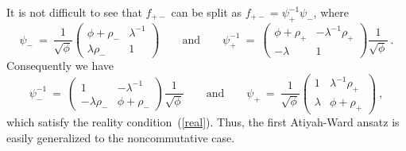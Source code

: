 \documentclass[a4paper,11pt]{article}
\numberwithin{equation}{section}
\def\l{\lambda}
\def\r{\rho}
\begin{document}
It is not difficult to see that $f_{+-}$ can be split as
$f_{+-}=\psi^{-1}_+\psi_-$, where
\begin{equation}
\psi_-\ =\ \frac{1}{\sqrt\phi}
\begin{pmatrix} \phi+\r_- & {\l}^{-1} \\ \l\r_- & 1 \end{pmatrix}
\qquad\textrm{and}\qquad
\psi^{-1}_+\ =\ 
\begin{pmatrix} \phi+\r_+ & -{\l}^{-1}\r_+ \\ -\l & 1 \end{pmatrix} 
\frac{1}{\sqrt\phi}\ .
\end{equation}
Consequently we have
\begin{equation}
\psi^{-1}_-\ =\ 
\begin{pmatrix} 1 & -{\l}^{-1} \\ -\l\r_- & \phi+\r_- \end{pmatrix}
\frac{1}{\sqrt\phi}
\qquad\textrm{and}\qquad
\psi_+\ =\ \frac{1}{\sqrt\phi}
\begin{pmatrix} 1 & {\l}^{-1}\r_+ \\ \l & \phi+\r_+ \end{pmatrix}\ ,
\end{equation}
which satisfy the reality condition~(\ref{real}).
Thus, the first Atiyah-Ward ansatz is easily generalized to the 
noncommutative case.
\end{document}
